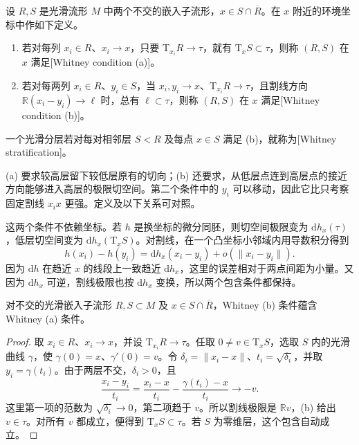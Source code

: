 \begin{definition}\label{g2:def:whitney-conditions}
	设 \(R,S\) 是光滑流形 \(M\) 中两个不交的嵌入子流形，\(x\in S\cap\overline R\)。在 \(x\) 附近的环境坐标中作如下定义。
	\begin{enumerate}
		\item 若对每列 \(x_i\in R\)、\(x_i\to x\)，只要 \(\mathrm T_{x_i}R\to\tau\)，就有 \(\mathrm T_xS\subset\tau\)，则称 \((R,S)\) 在 \(x\) 满足[Whitney condition (a)]。
		\item 若对每两列 \(x_i\in R\)、\(y_i\in S\)，当 \(x_i,y_i\to x\)、\(\mathrm T_{x_i}R\to\tau\)，且割线方向 \(\mathbb R(x_i-y_i)\to\ell\) 时，总有 \(\ell\subset\tau\)，则称 \((R,S)\) 在 \(x\) 满足[Whitney condition (b)]。
	\end{enumerate}
	一个光滑分层若对每对相邻层 \(S<R\) 及每点 \(x\in S\) 满足 (b)，就称为[Whitney stratification]。
\end{definition}

(a) 要求较高层留下较低层原有的切向；(b) 还要求，从低层点连到高层点的接近方向能够进入高层的极限切空间。第二个条件中的 \(y_i\) 可以移动，因此它比只考察固定割线 \(x_ix\) 更强。定义及以下关系可对照\cite[第1—2节]{Mather2012TopologicalStability}。

\ProseParagraphBreak

这两个条件不依赖坐标。若 \(h\) 是换坐标的微分同胚，则切空间极限变为 \(\mathrm dh_x(\tau)\)，低层切空间变为 \(\mathrm dh_x(\mathrm T_xS)\)。对割线，在一个凸坐标小邻域内用导数积分得到
\[
	h(x_i)-h(y_i)=\mathrm dh_x(x_i-y_i)+o(\lVert x_i-y_i\rVert).
\]
因为 \(\mathrm dh\) 在趋近 \(x\) 的线段上一致趋近 \(\mathrm dh_x\)，这里的误差相对于两点间距为小量。又因为 \(\mathrm dh_x\) 可逆，割线极限也按 \(\mathrm dh_x\) 变换，所以两个包含条件都保持。

\begin{proposition}\label{g2:prop:whitney-b-implies-a}
	对不交的光滑嵌入子流形 \(R,S\subset M\) 及 \(x\in S\cap\overline R\)，Whitney (b) 条件蕴含 Whitney (a) 条件。
\end{proposition}
\begin{proof}
	取 \(x_i\in R\)、\(x_i\to x\)，并设 \(\mathrm T_{x_i}R\to\tau\)。任取 \(0\ne v\in\mathrm T_xS\)，选取 \(S\) 内的光滑曲线 \(\gamma\)，使 \(\gamma(0)=x\)、\(\gamma'(0)=v\)。令 \(\delta_i=\lVert x_i-x\rVert\)、\(t_i=\sqrt{\delta_i}\)，并取 \(y_i=\gamma(t_i)\)。由于两层不交，\(\delta_i>0\)，且
	\[
		\frac{x_i-y_i}{t_i}
		=\frac{x_i-x}{t_i}-\frac{\gamma(t_i)-x}{t_i}\longrightarrow-v.
	\]
	这里第一项的范数为 \(\sqrt{\delta_i}\to0\)，第二项趋于 \(v\)。所以割线极限是 \(\mathbb Rv\)，(b) 给出 \(v\in\tau\)。对所有 \(v\) 都成立，便得到 \(\mathrm T_xS\subset\tau\)。若 \(S\) 为零维层，这个包含自动成立。
\end{proof}

